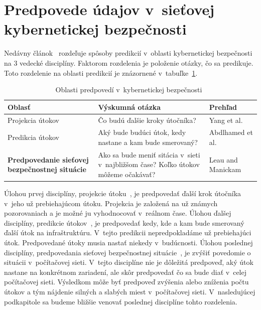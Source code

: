 \documentclass[thesismargins, thesislinespacing, openright, upjsfrontpage]{rnthesis}
\begin{document}
\section{Predpovede údajov v~sieťovej kybernetickej bezpečnosti} \label{discipliny}

Nedávny článok~\cite{Husak2018survey} rozdeľuje spôsoby predikcií v~oblasti kybernetickej bezpečnosti na 3 vedecké disciplíny. Faktorom rozdelenia je položenie otázky, čo sa predikuje. Toto rozdelenie na oblasti predikcií je znázornené v~tabuľke~\ref{Tab:husak}.

\begin{table}
\begin{center}
\begin{tabular}{ | p{4cm} | p{6cm} | p{3cm} | }
\hline
\textbf{Oblasť} & \textbf{Výskumná otázka} & \textbf{Prehľad} \\
\hline
\hline Projekcia útokov & Čo budú ďalšie kroky útočníka? & Yang et al.~\cite{Yang2014} \\
\hline Predikcia útokov & Aký bude budúci útok, kedy nastane a kam bude smerovaný? & Abdlhamed et al.~\cite{Abdlhamed2017} \\
\hline \textbf{Predpovedanie sieťovej bezpečnostnej situácie} & Ako sa bude meniť sitácia v~sieti v~najbližšom čase? Koľko útokov môžeme očakávať? & Leau and  Manickam~\cite{Leau2015} \\
\hline
\end{tabular}
\end{center}
\label{Tab:husak}
\caption{Oblasti predpovedí v~kybernetickej bezpečnosti~\cite{Husak2018survey}}
\end{table}

Úlohou prvej disciplíny, projekcie útoku~\cite{Yang2014}, je predpovedať ďalší krok útočníka v~jeho už prebiehajúcom útoku. Projekcia je založená na už známych pozorovaniach a je možné ju vyhodnocovať v~reálnom čase. Úlohou ďalšej disciplíny, predikcie útokov~\cite{Abdlhamed2017}, je predpovedať kedy, kde a kam bude smerovaný ďalší útok na infraštruktúru. V~tejto predikcii nepredpokladáme už prebiehajúci útok. Predpovedané útoky musia nastať niekedy v~budúcnosti. Úlohou poslednej disciplíny, predpovedania sieťovej bezpečnostnej situácie~\cite{wei2013comprehensive,Leau2015}, je zvýšiť povedomie o situácii v~počítačovej sieti. V~tejto disciplíne nie je dôležitá predpoveď, aký útok nastane na konkrétnom zariadení, ale skôr predpovedať čo sa bude diať v~celej počítačovej sieti. Výsledkom môže byť predpoveď zvýšenia alebo zníženia počtu útokov a tým nájdenie silných a slabých miest v~počítačovej sieti. V~nasledujúcej podkapitole sa budeme bližšie venovať poslednej disciplíne tohto rozdelenia.
\end{document}
